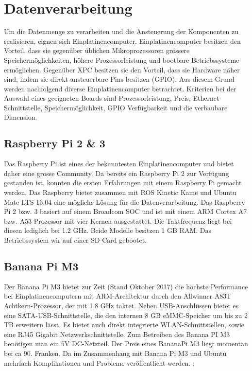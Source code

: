 \section{Datenverarbeitung}
\label{sec:Datenverarbeitung}
Um die Datenmenge zu verarbeiten und die Ansteuerung der Komponenten zu realisieren, eignen sich Einplatinencomputer. Einplatinencomputer besitzen den Vorteil, dass sie gegenüber üblichen Mikroprozessoren grössere Speichermöglichkeiten, höhere Prozessorleistung und bootbare Betriebssysteme ermöglichen. Gegenüber \ac{XPC} besitzen sie den Vorteil, dass sie Hardware näher sind, indem sie direkt ansteuerbare Pins besitzen (GPIO). Aus diesem Grund werden nachfolgend diverse Einplatinencomputer betrachtet. Kriterien bei der Auswahl eines geeigneten Boards sind Prozessorleistung, Preis, Ethernet-Schnittstelle, Speichermöglichkeit, GPIO Verfügbarkeit und die verbaubare Dimension. 

\subsection{Raspberry Pi 2 \& 3}
\label{subsec:Raspberry}
Das Raspberry Pi ist eines der bekanntesten Einplatinencomputer und bietet daher eine grosse Community. Da bereits ein Raspberry Pi 2 zur Verfügung gestanden ist, konnten die ersten Erfahrungen mit einem Raspberry Pi gemacht werden. Das Raspberry bietet zusammen mit ROS Kinetic Kame und Ubuntu Mate LTS 16.04 eine mögliche Lösung für die Datenverarbeitung. Das Raspberry Pi 2 bzw. 3 basiert auf einem Broadcom \ac{SOC} und ist mit einem ARM Cortex A7 bzw. A53 Prozessor mit vier Kernen ausgestattet. Die Taktfrequenz liegt bei diesen lediglich bei 1.2 GHz. Beide Modelle besitzen 1 GB RAM. Das Betriebssystem wir auf einer \ac{SD}-Card gebootet.

\subsection{Banana Pi M3}
\label{subsec:BananaPi}
Der Banana Pi M3 bietet zur Zeit (Stand Oktober 2017) die höchste Performance bei Einplatinencomputern mit ARM-Architektur durch den Allwinner A83T Achtkern-Prozessor, der mit 1.8 GHz taktet. Neben USB-Anschlüssen bietet es eine SATA-USB-Schnittstelle, die den internen 8 GB \ac{eMMC}-Speicher um bis zu 2 TB erweitern lässt. Es bietet auch direkt integrierte WLAN-Schnittstellen, sowie eine RJ45 Gigabit Netzwerkschnittstelle. Zum Betreiben des Banana PI M3 benötigen man ein 5V DC-Netzteil. Der Preis eines BananaPi M3 liegt momentan bei ca 90. Franken. Da im Zusammenhang mit Banana Pi M3 und Ubuntu mehrfach Komplikationen und Probleme veröffentlicht werden. \cite{banana}; 

